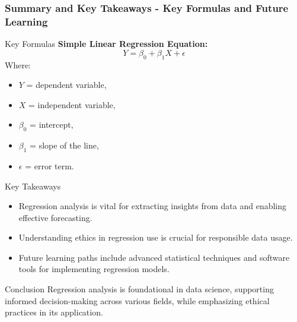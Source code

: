 \documentclass{beamer}
\begin{document}
\begin{frame}[fragile]
    \frametitle{Summary and Key Takeaways - Key Formulas and Future Learning}
    \begin{block}{Key Formulas}
        \textbf{Simple Linear Regression Equation:}
        \begin{equation}
            Y = \beta_0 + \beta_1 X + \epsilon
        \end{equation}
        Where:
        \begin{itemize}
            \item $Y$ = dependent variable,
            \item $X$ = independent variable,
            \item $\beta_0$ = intercept,
            \item $\beta_1$ = slope of the line,
            \item $\epsilon$ = error term.
        \end{itemize}
    \end{block}
    
    \begin{block}{Key Takeaways}
        \begin{itemize}
            \item Regression analysis is vital for extracting insights from data and enabling effective forecasting.
            \item Understanding ethics in regression use is crucial for responsible data usage.
            \item Future learning paths include advanced statistical techniques and software tools for implementing regression models.
        \end{itemize}
    \end{block}
    
    \begin{block}{Conclusion}
        Regression analysis is foundational in data science, supporting informed decision-making across various fields, while emphasizing ethical practices in its application.
    \end{block}
\end{frame}
\end{document}
